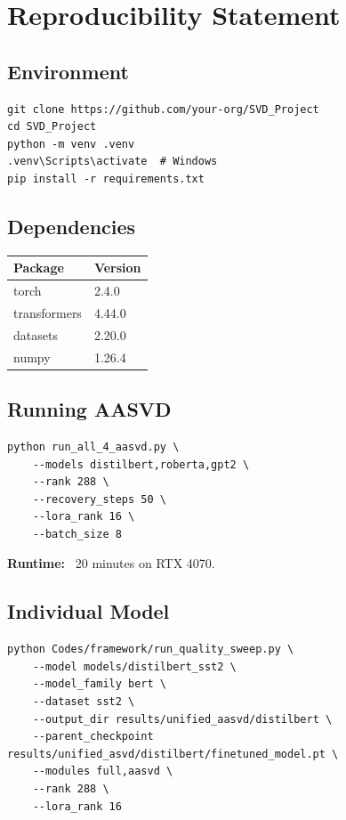
\section{Reproducibility Statement}

\subsection{Environment}

\begin{lstlisting}
git clone https://github.com/your-org/SVD_Project
cd SVD_Project
python -m venv .venv
.venv\Scripts\activate  # Windows
pip install -r requirements.txt
\end{lstlisting}

\subsection{Dependencies}

\begin{table}[H]
\centering
\small
\begin{tabular}{ll}
\toprule
\textbf{Package} & \textbf{Version} \\
\midrule
torch & 2.4.0 \\
transformers & 4.44.0 \\
datasets & 2.20.0 \\
numpy & 1.26.4 \\
\bottomrule
\end{tabular}
\end{table}

\subsection{Running AASVD}

\begin{lstlisting}
python run_all_4_aasvd.py \
    --models distilbert,roberta,gpt2 \
    --rank 288 \
    --recovery_steps 50 \
    --lora_rank 16 \
    --batch_size 8
\end{lstlisting}

\textbf{Runtime:} ~20 minutes on RTX 4070.

\subsection{Individual Model}

\begin{lstlisting}
python Codes/framework/run_quality_sweep.py \
    --model models/distilbert_sst2 \
    --model_family bert \
    --dataset sst2 \
    --output_dir results/unified_aasvd/distilbert \
    --parent_checkpoint results/unified_asvd/distilbert/finetuned_model.pt \
    --modules full,aasvd \
    --rank 288 \
    --lora_rank 16
\end{lstlisting}

